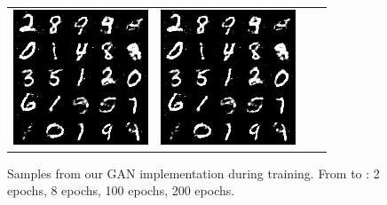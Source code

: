 \documentclass{article}
\begin{document}
\begin{figure}
\begin{tabularx}{\linewidth}{XXXX}
    \includegraphics[width=\linewidth]{assignment_3/code/figures/gan_94000.png} &
    \includegraphics[width=\linewidth]{assignment_3/code/figures/gan_94000.png}
  \end{tabularx}

  \caption{Samples from our GAN implementation during training. From  to : 2 epochs, 8 epochs, 100 epochs, 200 epochs.}
  \label{fig:gan_samples}
\end{figure}
\end{document}
